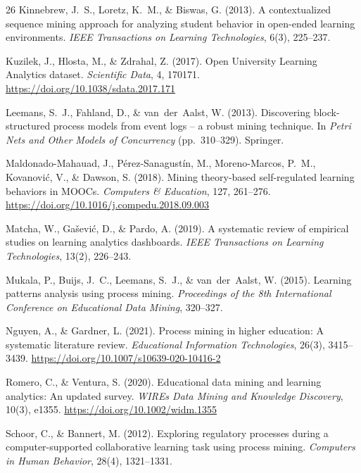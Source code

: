 \begin{thebibliography}{26}
Kinnebrew, J.~S., Loretz, K.~M., \& Biswas, G. (2013). A contextualized sequence mining approach for analyzing student behavior in open-ended learning environments. \textit{IEEE Transactions on Learning Technologies}, 6(3), 225--237.

Kuzilek, J., Hlosta, M., \& Zdrahal, Z. (2017). Open University Learning Analytics dataset. \textit{Scientific Data}, 4, 170171. \url{https://doi.org/10.1038/sdata.2017.171}

Leemans, S.~J., Fahland, D., \& van~der~Aalst, W. (2013). Discovering block-structured process models from event logs -- a robust mining technique. In \textit{Petri Nets and Other Models of Concurrency} (pp.~310--329). Springer.

Maldonado-Mahauad, J., P{\'e}rez-Sanagust{\'i}n, M., Moreno-Marcos, P.~M., Kovanovi{\'c}, V., \& Dawson, S. (2018). Mining theory-based self-regulated learning behaviors in MOOCs. \textit{Computers \& Education}, 127, 261--276. \url{https://doi.org/10.1016/j.compedu.2018.09.003}

Matcha, W., Ga{\v{s}}evi{\'c}, D., \& Pardo, A. (2019). A systematic review of empirical studies on learning analytics dashboards. \textit{IEEE Transactions on Learning Technologies}, 13(2), 226--243.

Mukala, P., Buijs, J.~C., Leemans, S.~J., \& van~der~Aalst, W. (2015). Learning patterns analysis using process mining. \textit{Proceedings of the 8th International Conference on Educational Data Mining}, 320--327.

Nguyen, A., \& Gardner, L. (2021). Process mining in higher education: A systematic literature review. \textit{Educational Information Technologies}, 26(3), 3415--3439. \url{https://doi.org/10.1007/s10639-020-10416-2}

Romero, C., \& Ventura, S. (2020). Educational data mining and learning analytics: An updated survey. \textit{WIREs Data Mining and Knowledge Discovery}, 10(3), e1355. \url{https://doi.org/10.1002/widm.1355}

Schoor, C., \& Bannert, M. (2012). Exploring regulatory processes during a computer-supported collaborative learning task using process mining. \textit{Computers in Human Behavior}, 28(4), 1321--1331.


\end{thebibliography}

